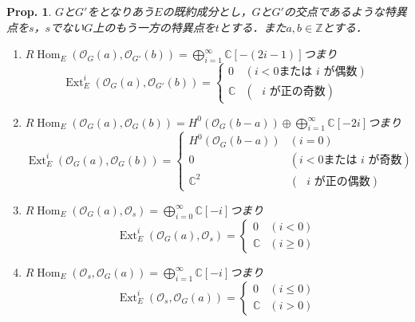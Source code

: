 \documentclass[uplatex,a4paper,11pt,dvipdfmx]{jsarticle}
\theoremstyle{mystyle} %
\newtheorem{proposition}{Prop.}[section]
\DeclareMathOperator{\Hom}{Hom}
\DeclareMathOperator{\Ext}{Ext}
\begin{document}
\begin{proposition}
	$G$と$G'$をとなりあう$E$の既約成分とし，$G$と$G'$の交点であるような特異点を$s$，$s$でない$G$上のもう一方の特異点を$t$とする．また$a, b \in \mathbb{Z}$とする．
	\begin{enumerate}
		\item $R\Hom_E(\mathcal{O}_G(a), \mathcal{O}_{G'}(b)) = \bigoplus_{i=1}^\infty \mathbb{C}[-(2i-1)]$つまり$$\Ext^i_E(\mathcal{O}_G(a), \mathcal{O}_{G'}(b)) = \left \{
			      \begin{array}{ll}
				      0          & (i<0 \text{または $i$ が偶数}) \\
				      \mathbb{C} & (\text{ $i$ が正の奇数})
			      \end{array}
			      \right.$$
		\item $R\Hom_E(\mathcal{O}_G(a), \mathcal{O}_G(b)) = H^0(\mathcal{O}_G(b-a)) \oplus \bigoplus_{i=1}^\infty \mathbb{C}[-2i]$つまり$$\Ext^i_E(\mathcal{O}_G(a), \mathcal{O}_G(b)) =\left \{
			      \begin{array}{ll}
				      H^0(\mathcal{O}_G(b-a)) & (i=0)                            \\
				      0                       & (i < 0 \text{または $i$ が奇数}) \\
				      \mathbb{C}^2            & (\text{ $i$ が正の偶数})
			      \end{array}
			      \right.$$
		\item $R\Hom_E(\mathcal{O}_G(a), \mathcal{O}_s) = \bigoplus_{i=0}^\infty \mathbb{C}[-i]$つまり$$\Ext^i_E(\mathcal{O}_G(a), \mathcal{O}_s) =\left \{
			      \begin{array}{ll}
				      0          & (i< 0)    \\
				      \mathbb{C} & (i\geq 0)
			      \end{array}
			      \right.$$
		\item $R\Hom_E(\mathcal{O}_s, \mathcal{O}_G(a)) = \bigoplus_{i=1}^\infty \mathbb{C}[-i]$つまり$$\Ext^i_E(\mathcal{O}_s, \mathcal{O}_G(a)) =\left \{
			      \begin{array}{ll}
				      0          & (i\leq 0) \\
				      \mathbb{C} & (i>0)
			      \end{array}
			      \right.$$
	\end{enumerate}
\end{proposition}
\end{document}
